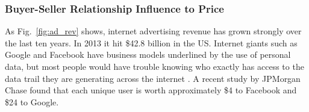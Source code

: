 \documentclass{mcmthesis}
\begin{document}

\subsubsection{Buyer-Seller Relationship Influence to Price}



As Fig.~\ref{fig:ad_rev} shows, internet advertising revenue has grown strongly over the last ten years. In 2013 it hit \$42.8 billion in the US. Internet giants such as Google and Facebook have business models underlined by the use of personal data, but most people would have trouble knowing who exactly has access to the data trail they are generating across the internet \cite{Detemple2016The}.  A recent study by JPMorgan Chase \cite{brustein2012start} found that each unique user is worth approximately \$4 to Facebook and \$24 to Google. 
\end{document}
